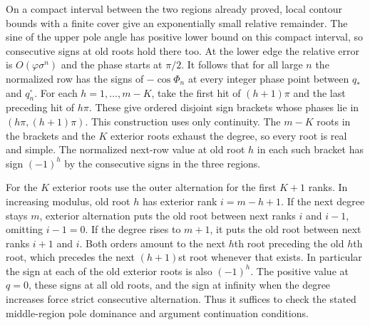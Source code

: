 \documentclass[11pt]{article}
\begin{document}
On a compact interval between the two regions already proved, local contour bounds with a finite cover give an exponentially small relative remainder. The sine of the upper pole angle has positive lower bound on this compact interval, so consecutive signs at old roots hold there too. At the lower edge the relative error is $O(\varphi\sigma^n)$ and the phase starts at $\pi/2$. It follows that for all large $n$ the normalized row has the signs of $-\cos\Phi_n$ at every integer phase point between $q_*$ and $q_n^\circ$. For each $h=1,\ldots,m-K$, take the first hit of $(h+1)\pi$ and the last preceding hit of $h\pi$. These give ordered disjoint sign brackets whose phases lie in $(h\pi,(h+1)\pi)$. This construction uses only continuity. The $m-K$ roots in the brackets and the $K$ exterior roots exhaust the degree, so every root is real and simple. The normalized next-row value at old root $h$ in each such bracket has sign $(-1)^h$ by the consecutive signs in the three regions.

For the $K$ exterior roots use the outer alternation for the first $K+1$ ranks. In increasing modulus, old root $h$ has exterior rank $i=m-h+1$. If the next degree stays $m$, exterior alternation puts the old root between next ranks $i$ and $i-1$, omitting $i-1=0$. If the degree rises to $m+1$, it puts the old root between next ranks $i+1$ and $i$. Both orders amount to the next $h$th root preceding the old $h$th root, which precedes the next $(h+1)$st root whenever that exists. In particular the sign at each of the old exterior roots is also $(-1)^h$. The positive value at $q=0$, these signs at all old roots, and the sign at infinity when the degree increases force strict consecutive alternation. Thus it suffices to check the stated middle-region pole dominance and argument continuation conditions.
\end{document}
